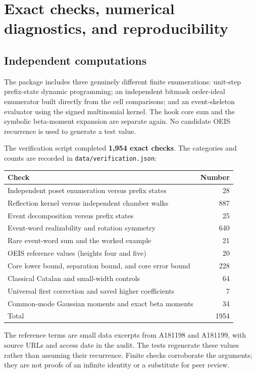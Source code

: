 \documentclass[11pt,letterpaper]{article}
\numberwithin{equation}{section}
\theoremstyle{definition}
\newcommand{\1}{\mathbf 1}
\begin{document}
\section{Exact checks, numerical diagnostics, and reproducibility}
\label{shr:bp:sec:computation}

\subsection{Independent computations}
The package includes three genuinely different finite enumerations:
unit-step prefix-state dynamic programming; an independent bitmask
order-ideal enumerator built directly from the cell comparisons; and an
event-skeleton evaluator using the signed multinomial kernel. The hook
core sum and the symbolic beta-moment expansion are separate again.
No candidate OEIS recurrence is used to generate a test value.

The verification script completed \textbf{1,954 exact checks}. The
categories and counts are recorded in \texttt{data/verification.json}:
\begin{center}\small
\begin{tabular}{@{}lr@{}}
\toprule
Check & Number\\
\midrule
Independent poset enumeration versus prefix states & 28\\
Reflection kernel versus independent chamber walks & 887\\
Event decomposition versus prefix states & 25\\
Event-word realizability and rotation symmetry & 640\\
Rare event-word sum and the worked example & 21\\
OEIS reference values (heights four and five) & 20\\
Core lower bound, separation bound, and core error bound & 228\\
Classical Catalan and small-width controls & 64\\
Universal first correction and saved higher coefficients & 7\\
Common-mode Gaussian moments and exact beta moments & 34\\
\midrule
Total & 1954\\
\bottomrule
\end{tabular}
\end{center}
The reference terms are small data excerpts from A181198 and A181199,
with source URLs and access date in the audit. The tests regenerate these
values rather than assuming their recurrence. Finite checks corroborate
the arguments; they are not proofs of an infinite identity or a substitute
for peer review.
\end{document}
